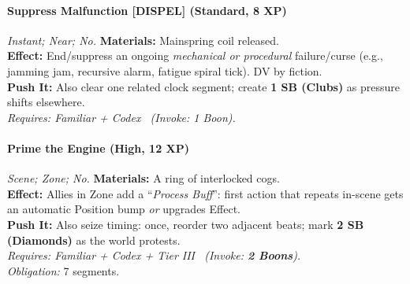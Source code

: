 \paragraph{Suppress Malfunction \textnormal{[DISPEL]} (Standard, 8 XP)} \emph{Instant; Near; No.}
\textbf{Materials:} Mainspring coil released.\\
\textbf{Effect:} End/suppress an ongoing \emph{mechanical or procedural} failure/curse (e.g., jamming jam, recursive alarm, fatigue spiral tick). DV by fiction.\\
\textbf{Push It:} Also clear one related clock segment; create \textbf{1 SB (Clubs)} as pressure shifts elsewhere.\\
\emph{Requires: Familiar + Codex \ (\textit{Invoke:} 1 Boon).}

\paragraph{Prime the Engine (High, 12 XP)} \emph{Scene; Zone; No.}
\textbf{Materials:} A ring of interlocked cogs.\\
\textbf{Effect:} Allies in Zone add a “\emph{Process Buff}”: first action that repeats in-scene gets an automatic Position bump \emph{or} upgrades Effect.\\
\textbf{Push It:} Also seize timing: once, reorder two adjacent beats; mark \textbf{2 SB (Diamonds)} as the world protests.\\
\emph{Requires: Familiar + Codex + Tier III \ (\textit{Invoke:} \textbf{2 Boons}).}\\
\emph{Obligation:} 7 segments.
